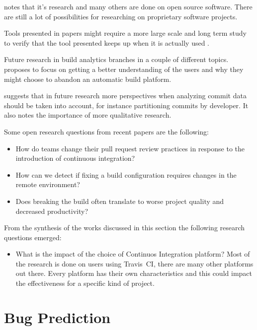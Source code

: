 \documentclass[]{book}
\providecommand{\tightlist}{%
  \setlength{\itemsep}{0pt}\setlength{\parskip}{0pt}}
\begin{document}
\citet{pinto2018work} notes that it's research and many others are done
on open source software. There are still a lot of possibilities for
researching on proprietary software projects.

Tools presented in papers might require a more large scale and long term
study to verify that the tool presented keeps up when it is actually
used \citep{santolucito2018statically}.

Future research in build analytics branches in a couple of different
topics. \citet{pinto2018work} proposes to focus on getting a better
understanding of the users and why they might choose to abandon an
automatic build platform.

\citet{baltes2018no} suggests that in future research more perspectives
when analyzing commit data should be taken into account, for instance
partitioning commits by developer. It also notes the importance of more
qualitative research.

Some open research questions from recent papers are the following:

\begin{itemize}
\tightlist
\item
  How do teams change their pull request review practices in response to
  the introduction of continuous integration? \citep{zhao2017impact}
\item
  How can we detect if fixing a build configuration requires changes in
  the remote environment? \citep{vassallo2018break}
\item
  Does breaking the build often translate to worse project quality and
  decreased productivity? \citep{beller2017oops}
\end{itemize}

From the synthesis of the works discussed in this section the following
research questions emerged:

\begin{itemize}
\tightlist
\item
  What is the impact of the choice of Continuos Integration platform?
  Most of the research is done on users using Travis~CI, there are many
  other platforms out there. Every platform has their own
  characteristics and this could impact the effectiveness for a specific
  kind of project.
\end{itemize}

\chapter{Bug Prediction}\label{bug-prediction}
\end{document}
